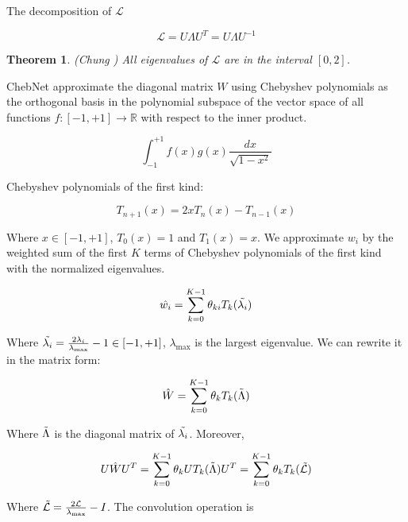 \documentclass{article}
\newtheorem{theorem}{Theorem}
\begin{document}
The decomposition of $\mathcal{L}$

\begin{equation}
    \mathcal{L} = U \Lambda U^T = U \Lambda U^{-1}
\end{equation}

\begin{theorem}(Chung \cite{chung1997spectral})
All eigenvalues of $\mathcal{L}$ are in the interval $[0, 2]$.
\end{theorem}

ChebNet \cite{tang2019chebnet} approximate the diagonal matrix $W$ using Chebyshev polynomials as the orthogonal basis in the polynomial subspace of the vector space of all functions $f: [-1, +1] \to \mathbb{R}$ with respect to the inner product.

\begin{equation}
    \int_{-1}^{+1} f(x) g(x) \frac{dx}{\sqrt{1-x^2}}
\end{equation}

Chebyshev polynomials of the first kind:

\begin{equation}
    T_{n+1}(x) = 2x T_n(x) - T_{n-1}(x)
\end{equation}

Where $x \in [-1, +1]$, $T_0(x) = 1$ and $T_1(x) = x$. We approximate $w_i$ by the weighted sum of the first $K$ terms of Chebyshev polynomials of the first kind with the normalized eigenvalues.

\begin{equation}
    \hat{w_i} = \sum_{k=0}^{K-1} \theta_{k i} T_k(\Tilde{\lambda_i})
\end{equation}

Where $\Tilde{\lambda_i} = \frac{2 \lambda_i}{\lambda_{\max}} - 1 \in [-1, +1]$, $\lambda_{\max}$ is the largest eigenvalue. We can rewrite it in the matrix form:

\begin{equation}
    \hat{W} = \sum_{k=0}^{K-1} \theta_k T_k(\Tilde{\Lambda})
\end{equation}

Where $\Tilde{\Lambda}$ is the diagonal matrix of $\Tilde{\lambda_i}$. Moreover,

\begin{equation}
    U \hat{W} U^T = \sum_{k=0}^{K-1} \theta_k U T_k(\Tilde{\Lambda}) U^T = \sum_{k=0}^{K-1} \theta_k T_k(\Tilde{\mathcal{L}})
\end{equation}

Where $\Tilde{\mathcal{L}} = \frac{2 \mathcal{L}}{\lambda_{\max}} - I$. The convolution operation is
\end{document}
